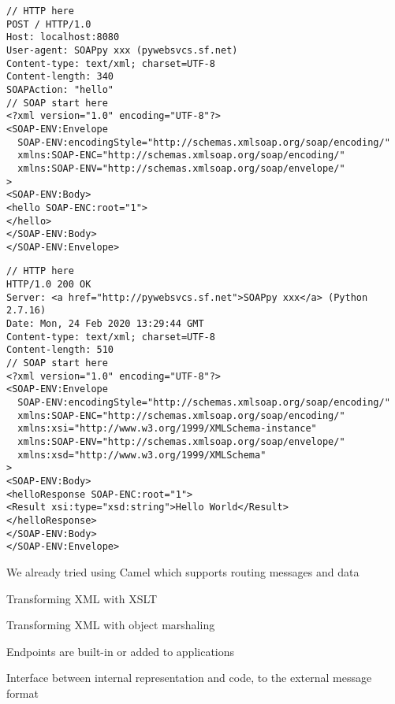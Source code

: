 \documentclass[Screen16to9,17pt]{foils}
\begin{document}

\begin{verbatim}
// HTTP here
POST / HTTP/1.0
Host: localhost:8080
User-agent: SOAPpy xxx (pywebsvcs.sf.net)
Content-type: text/xml; charset=UTF-8
Content-length: 340
SOAPAction: "hello"
// SOAP start here
<?xml version="1.0" encoding="UTF-8"?>
<SOAP-ENV:Envelope
  SOAP-ENV:encodingStyle="http://schemas.xmlsoap.org/soap/encoding/"
  xmlns:SOAP-ENC="http://schemas.xmlsoap.org/soap/encoding/"
  xmlns:SOAP-ENV="http://schemas.xmlsoap.org/soap/envelope/"
>
<SOAP-ENV:Body>
<hello SOAP-ENC:root="1">
</hello>
</SOAP-ENV:Body>
</SOAP-ENV:Envelope>
\end{verbatim}


\begin{verbatim}
// HTTP here
HTTP/1.0 200 OK
Server: <a href="http://pywebsvcs.sf.net">SOAPpy xxx</a> (Python 2.7.16)
Date: Mon, 24 Feb 2020 13:29:44 GMT
Content-type: text/xml; charset=UTF-8
Content-length: 510
// SOAP start here
<?xml version="1.0" encoding="UTF-8"?>
<SOAP-ENV:Envelope
  SOAP-ENV:encodingStyle="http://schemas.xmlsoap.org/soap/encoding/"
  xmlns:SOAP-ENC="http://schemas.xmlsoap.org/soap/encoding/"
  xmlns:xsi="http://www.w3.org/1999/XMLSchema-instance"
  xmlns:SOAP-ENV="http://schemas.xmlsoap.org/soap/envelope/"
  xmlns:xsd="http://www.w3.org/1999/XMLSchema"
>
<SOAP-ENV:Body>
<helloResponse SOAP-ENC:root="1">
<Result xsi:type="xsd:string">Hello World</Result>
</helloResponse>
</SOAP-ENV:Body>
</SOAP-ENV:Envelope>
\end{verbatim}



We already tried using Camel which supports routing messages and data





\begin{list2}
\item Transforming XML with XSLT
\item Transforming XML with object marshaling
\end{list2}




\begin{list2}
\item Endpoints are built-in or added to applications
\item Interface between internal representation and code, to the external message format
\end{list2}
\end{document}
